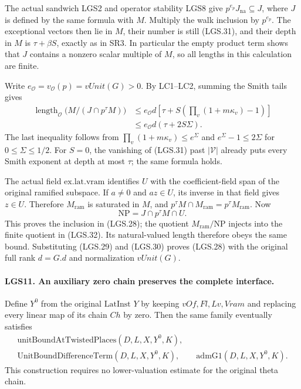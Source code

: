 \documentclass[11pt,a4paper]{article}
\numberwithin{equation}{section}
\theoremstyle{remark}\newtheorem{remark}[theorem]{Remark}
\begin{document}
The actual sandwich LGS2 and operator stability LGS8
give \(p^{e_p}J_{\mathrm{na}}\subseteq J\), where \(J\)
is defined by the same formula with \(M\).
Multiply the walk inclusion by \(p^{e_p}\).
The exceptional vectors then lie in \(M\), their number
is still (LGS.31), and their depth in \(M\) is
\(\tau+\beta S\), exactly as in SR3.
In particular the empty product term shows that \(J\)
contains a nonzero scalar multiple of \(M\), so all
lengths in this calculation are finite.

Write \(e_{\mathcal O}=v_{\mathcal O}(p)=vUnit(G)>0\).
By LC1--LC2, summing the Smith tails gives
\[
 \begin{split}
 \operatorname{length}_{\mathcal O}
       \bigl(M/(J\cap p^\tau M)\bigr)
 &\le e_{\mathcal O}d\left[
       \tau+S\left(\prod_v(1+m\kappa_v)-1\right)\right]\\
 &\le e_{\mathcal O}d(\tau+2S\Sigma).
 \end{split}                                                     \tag{LGS.32}
\]
The last inequality follows from
\(\prod_v(1+m\kappa_v)\le e^\Sigma\) and
\(e^\Sigma-1\le2\Sigma\) for \(0\le\Sigma\le1/2\).
For \(S=0\), the vanishing of (LGS.31) past
\(|\mathcal V|\) already puts every Smith exponent
at depth at most \(\tau\); the same formula holds.

The actual field \(\mathrm{ex.lat.vram}\) identifies
\(U\) with the coefficient-field span of the original
ramified subspace.  If \(a\ne0\) and \(az\in U\), its
inverse in that field gives \(z\in U\).  Therefore
\(M_{\mathrm{ram}}\) is saturated in \(M\), and
\(p^\tau M\cap M_{\mathrm{ram}}=p^\tau M_{\mathrm{ram}}\).
Now
\[
 \mathrm{NP}=J\cap p^\tau M\cap U.
 \]
This proves the inclusion in (LGS.28); the quotient
\(M_{\mathrm{ram}}/\mathrm{NP}\) injects into the
finite quotient in (LGS.32).  Its natural-valued length
therefore obeys the same bound.  Substituting (LGS.29)
and (LGS.30) proves (LGS.28) with the original full
rank \(d=G.d\) and normalization \(vUnit(G)\).

\paragraph{LGS11. An auxiliary zero chain preserves the complete interface.}
\label{claim:LGS11}
Define \(Y^0\) from the original \(\mathrm{LatInst}\)
\(Y\) by keeping \(vOf,Fl,Lv,Vram\) and replacing every
linear map of its chain \(Ch\) by zero.
Then the same family eventually satisfies
\[
 \begin{gathered}
 \mathrm{unitBoundAtTwistedPlaces}(D,L,X,Y^0,K),\\
 \mathrm{UnitBoundDifferenceTerm}(D,L,X,Y^0,K),\qquad
 \mathrm{admG1}(D,L,X,Y^0,K).
 \end{gathered}                                                   \tag{LGS.33}
\]
This construction requires no lower-valuation estimate
for the original theta chain.
\end{document}
